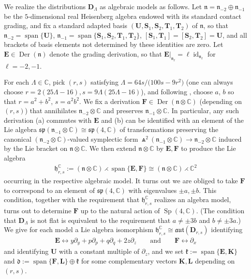 \documentclass[pdftex]{sigma}
\DeclareMathOperator{\Der} {Der}
\DeclareMathOperator{\id} {id}
\DeclareMathOperator{\Sp} {Sp}
\DeclareMathOperator{\spanOperator}{span}
\newcommand{\Span}[1]{\spanOperator\{{#1}\}}
\newcommand{\bbC}{\mathbb{C}}
\newcommand{\mbD}{\mathbf{D}}
\newcommand{\mbE}{\mathbf{E}}
\newcommand{\mbF}{\mathbf{F}}
\newcommand{\mbK}{\mathbf{K}}
\newcommand{\mbL}{\mathbf{L}}
\newcommand{\mbS}{\mathbf{S}}
\newcommand{\mbT}{\mathbf{T}}
\newcommand{\mbU}{\mathbf{U}}
\newcommand{\mfd} {\mathfrak{d}}
\newcommand{\mfh} {\mathfrak{h}}
\newcommand{\mfk} {\mathfrak{k}}
\newcommand{\mfn} {\mathfrak{n}}
\newcommand{\mfaut}{\mathfrak{aut}}
\newcommand{\mfsp} {\mathfrak{sp}}
\numberwithin{equation}{section}
\begin{document}
We realize the distributions $\mbD_{\Lambda}$ as algebraic models as follows. Let $\mfn = \mfn_{-2} \oplus \mfn_{-1}$ be the $5$-dimensional real Heisenberg algebra endowed with its standard contact grading, and fix a standard adapted basis $(\mbU, \mbS_1, \mbS_2, \mbT_1, \mbT_2)$ of $\mfn$, so that $\mfn_{-2} = \Span{\mbU}$, $\mfn_{-1} = \Span{\mbS_1, \mbS_2, \mbT_1, \mbT_2}$, $[\mbS_1, \mbT_1] = [\mbS_2, \mbT_2] = \mbU$, and all brackets of basis elements not determined by these identities are zero. Let $\mbE \in \Der(\mfn)$ denote the grading derivation, so that $\mbE\vert_{\mfn_\ell} = \ell \id_{\mfn_\ell}$ for $\ell = -2, -1$.

For each $\Lambda \in \bbC$, pick $(r, s)$ satisfying $\Lambda = 64 s / \big(100 s - 9 r^2\big)$ (one can always choose $r = 2 (25 \Lambda - 16), s = 9 \Lambda (25 \Lambda - 16)$), and following \cite[Section~3]{DoubrovKruglikov}, choose $a$, $b$ so that $r = a^2 + b^2$, $s = a^2 b^2$. We fix a derivation $\mbF \in \Der(\mfn \otimes \bbC)$ (depending on $(r, s)$) that annihilates $\mfn_{-2} \otimes \bbC$ and preserves $\mfn_{-1} \otimes \bbC$. In particular, any such derivation (a) commutes with $\mbE$ and (b) can be identified with an element of the Lie algebra $\mfsp(\mfn_{-1} \otimes \bbC) \cong \mfsp(4, \bbC)$ of transformations preserving the canonical $(\mfn_{-2} \otimes \bbC)$-valued symplectic form $\Wedge^2 (\mfn_{-1} \otimes \bbC) \to \mfn_{-2} \otimes \bbC$ induced by the Lie bracket on $\mfn \otimes \bbC$. We then extend $\mfn \otimes \bbC$ by $\mbE, \mbF$ to produce the Lie algebra
 \begin{gather*}
	 \boxed{
		 \mfh_{r, s}^{\bbC} := (\mfn \otimes \bbC) \rightthreetimes \Span{\mbE, \mbF} \cong (\mfn \otimes \bbC) \rightthreetimes \bbC^2
 }
 \end{gather*}
occurring in the respective algebraic model. It turns out we are obliged to take $\mbF$ to correspond to an element of $\mfsp(4, \bbC)$ with eigenvalues $\pm a, \pm b$. This condition, together with the requirement that $\mfh_{r, s}^{\bbC}$ realizes an algebra model, turns out to determine $\mbF$ up to the natural action of $\Sp(4, \bbC)$. (The condition that $\mbD_{\Lambda}$ is not flat is equivalent to the requirement that $a \neq \pm 3b$ and $b \neq \pm 3a$.) We give for each model a Lie algebra isomorphism $\mfh_{r, s}^{\bbC} \cong \mfaut(\mbD_{r, s})$ identifying
 \begin{gather*}
 \mbE \leftrightarrow y \partial_y + p \partial_p + q \partial_q + 2 z \partial_z
 \qquad \textrm{and} \qquad
 \mbF \leftrightarrow \partial_x
 \end{gather*}
and identifying $\mbU$ with a constant multiple of $\partial_z$, and we set $\mfk := \Span{\mbE, \mbK}$ and $\mfd := \Span{\mbF, \mbL} \oplus \mfk$ for some complementary vectors $\mbK, \mbL$ depending on $(r, s)$.
\end{document}

